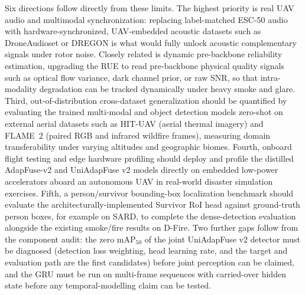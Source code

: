 \documentclass[journal]{IEEEtran}
\begin{document}
Six directions follow directly from these limits. The highest priority is real UAV audio and multimodal synchronization: replacing label-matched ESC-50 audio with hardware-synchronized, UAV-embedded acoustic datasets such as DroneAudioset or DREGON is what would fully unlock acoustic complementary signals under rotor noise. Closely related is dynamic pre-backbone reliability estimation, upgrading the RUE to read pre-backbone physical quality signals such as optical flow variance, dark channel prior, or raw SNR, so that intra-modality degradation can be tracked dynamically under heavy smoke and glare. Third, out-of-distribution cross-dataset generalization should be quantified by evaluating the trained multi-modal and object detection models zero-shot on external aerial datasets such as HIT-UAV (aerial thermal imagery) and FLAME~2 (paired RGB and infrared wildfire frames), measuring domain transferability under varying altitudes and geographic biomes. Fourth, onboard flight testing and edge hardware profiling should deploy and profile the distilled AdapFuse-v2 and UniAdapFuse v2 models directly on embedded low-power accelerators aboard an autonomous UAV in real-world disaster simulation exercises. Fifth, a person/survivor bounding-box localization benchmark should evaluate the architecturally-implemented Survivor RoI head against ground-truth person boxes, for example on SARD, to complete the dense-detection evaluation alongside the existing smoke/fire results on D-Fire. Two further gaps follow from the component audit: the zero $\mathrm{mAP}_{50}$ of the joint UniAdapFuse v2 detector must be diagnosed (detection loss weighting, head learning rate, and the target and evaluation path are the first candidates) before joint perception can be claimed, and the GRU must be run on multi-frame sequences with carried-over hidden state before any temporal-modelling claim can be tested.
\end{document}
